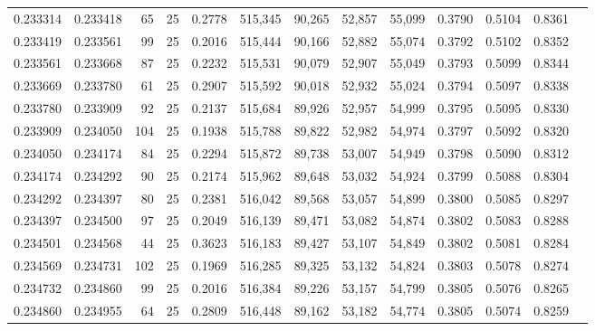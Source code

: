 \begin{tabular}{rrrrrrrrrrrrr}
0.233314 & 0.233418 &    65 &  25 &                                     0.2778 & 515,345 &  90,265 &  52,857 &  55,099 & 0.3790 & 0.5104 & 0.8361 \\
0.233419 & 0.233561 &    99 &  25 &                                     0.2016 & 515,444 &  90,166 &  52,882 &  55,074 & 0.3792 & 0.5102 & 0.8352 \\
0.233561 & 0.233668 &    87 &  25 &                                     0.2232 & 515,531 &  90,079 &  52,907 &  55,049 & 0.3793 & 0.5099 & 0.8344 \\
0.233669 & 0.233780 &    61 &  25 &                                     0.2907 & 515,592 &  90,018 &  52,932 &  55,024 & 0.3794 & 0.5097 & 0.8338 \\
0.233780 & 0.233909 &    92 &  25 &                                     0.2137 & 515,684 &  89,926 &  52,957 &  54,999 & 0.3795 & 0.5095 & 0.8330 \\
0.233909 & 0.234050 &   104 &  25 &                                     0.1938 & 515,788 &  89,822 &  52,982 &  54,974 & 0.3797 & 0.5092 & 0.8320 \\
0.234050 & 0.234174 &    84 &  25 &                                     0.2294 & 515,872 &  89,738 &  53,007 &  54,949 & 0.3798 & 0.5090 & 0.8312 \\
0.234174 & 0.234292 &    90 &  25 &                                     0.2174 & 515,962 &  89,648 &  53,032 &  54,924 & 0.3799 & 0.5088 & 0.8304 \\
0.234292 & 0.234397 &    80 &  25 &                                     0.2381 & 516,042 &  89,568 &  53,057 &  54,899 & 0.3800 & 0.5085 & 0.8297 \\
0.234397 & 0.234500 &    97 &  25 &                                     0.2049 & 516,139 &  89,471 &  53,082 &  54,874 & 0.3802 & 0.5083 & 0.8288 \\
0.234501 & 0.234568 &    44 &  25 &                                     0.3623 & 516,183 &  89,427 &  53,107 &  54,849 & 0.3802 & 0.5081 & 0.8284 \\
0.234569 & 0.234731 &   102 &  25 &                                     0.1969 & 516,285 &  89,325 &  53,132 &  54,824 & 0.3803 & 0.5078 & 0.8274 \\
0.234732 & 0.234860 &    99 &  25 &                                     0.2016 & 516,384 &  89,226 &  53,157 &  54,799 & 0.3805 & 0.5076 & 0.8265 \\
0.234860 & 0.234955 &    64 &  25 &                                     0.2809 & 516,448 &  89,162 &  53,182 &  54,774 & 0.3805 & 0.5074 & 0.8259 \\

\end{tabular}
